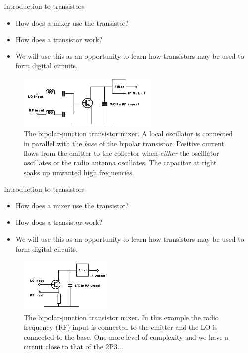 \documentclass{beamer}
\begin{document}
\begin{frame}{Introduction to transistors}
\begin{itemize}
\item \alert{How does a mixer use the transistor?}
\item How does a transistor work?
\item We will use this as an opportunity to learn how transistors may be used to form digital circuits.
\end{itemize}
\begin{figure}
\centering
\includegraphics[width=0.6\textwidth]{figures/BJT.png}
\caption{\label{fig:bjt} The bipolar-junction transistor mixer.  A local oscillator is connected in parallel with the \textit{base} of the bipolar transistor.  Positive current flows from the emitter to the collector when \textit{either} the oscillator oscillates or the radio antenna oscillates.  The capacitor at right soaks up unwanted high frequencies.}
\end{figure}
\end{frame}

\begin{frame}{Introduction to transistors}
\begin{itemize}
\item \alert{How does a mixer use the transistor?}
\item How does a transistor work?
\item We will use this as an opportunity to learn how transistors may be used to form digital circuits.
\end{itemize}
\begin{figure}
\centering
\includegraphics[width=0.4\textwidth]{figures/BJT2.png}
\caption{\label{fig:bjt2} The bipolar-junction transistor mixer.  In this example the radio frequency (RF) input is connected to the emitter and the LO is connected to the base.  One more level of complexity and we have a circuit close to that of the 2P3...}
\end{figure}
\end{frame}
\end{document}
